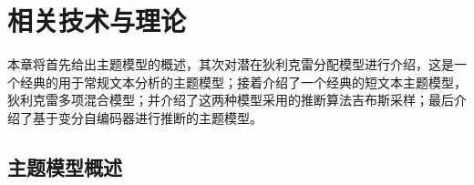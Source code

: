 \chapter{相关技术与理论}\label{chap:preliminary}
本章将首先给出主题模型的概述，其次对潜在狄利克雷分配模型进行介绍，这是一个经典的用于常规文本分析的主题模型；接着介绍了一个经典的短文本主题模型，狄利克雷多项混合模型；并介绍了这两种模型采用的推断算法吉布斯采样；最后介绍了基于变分自编码器进行推断的主题模型。

\section{主题模型概述}
